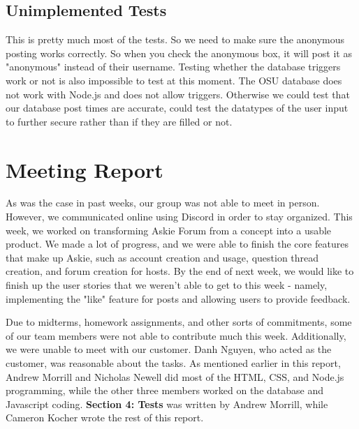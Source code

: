 \documentclass[12pt]{article}
\begin{document}
\subsection{Unimplemented Tests}
\begin{flushleft}
This is pretty much most of the tests.  So we need to make sure the anonymous posting works correctly.  So when you check the anonymous box, it will post it as "anonymous" instead of their username.  
Testing whether the database triggers work or not is also impossible to test at this moment.  The OSU database does not work with Node.js and does not allow triggers.  Otherwise we could test that our database post times are accurate, could test the datatypes of the user input to further secure rather than if they are filled or not.  
\end{flushleft}


\section{Meeting Report}
\begin{flushleft}
As was the case in past weeks, our group was not able to meet in person. However, we communicated online using Discord in order to stay organized. This week, we worked on transforming Askie Forum from a concept into a usable product. We made a lot of progress, and we were able to finish the core features that make up Askie, such as account creation and usage, question thread creation, and forum creation for hosts. By the end of next week, we would like to finish up the user stories that we weren't able to get to this week - namely, implementing the "like" feature for posts and allowing users to provide feedback.
\end{flushleft}

\begin{flushleft}
Due to midterms, homework assignments, and other sorts of commitments, some of our team members were not able to contribute much this week. Additionally, we were unable to meet with our customer. Danh Nguyen, who acted as the customer, was reasonable about the tasks. As mentioned earlier in this report, Andrew Morrill and Nicholas Newell did most of the HTML, CSS, and Node.js programming, while the other three members worked on the database and Javascript coding. \textbf{Section 4: Tests} was written by Andrew Morrill, while Cameron Kocher wrote the rest of this report.
\end{flushleft}
\end{document}
